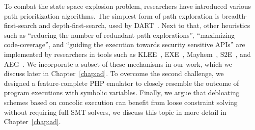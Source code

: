 To combat the state space explosion problem, researchers have introduced various path prioritization algorithms. 
The simplest form of path exploration is breadth-first-search and depth-first-search, used by DART~\cite{godefroid2005dart}. 
Next to that, other heuristics such as ``reducing the number of redundant path explorations'', ``maximizing code-coverage'', and ``guiding the execution towards security sensitive APIs'' are implemented by researchers in tools such as KLEE~\cite{cadar2008klee}, EXE~\cite{cadar2008exe}, Mayhem~\cite{cha2012unleashing}, S2E~\cite{cha2012unleashing}, and AEG~\cite{avgerinos2014automatic}. 
We incorporate a subset of these mechanisms in our work, which we discuss later in Chapter~\ref{chap:ad}. 
To overcome the second challenge, we designed a feature-complete PHP emulator to closely resemble the outcome of program executions with symbolic variables. 
Finally, we argue that debloating schemes based on concolic execution can benefit from loose constraint solving without requiring full SMT solvers, we discuss this topic in more detail in Chapter~\ref{chap:ad}. 
